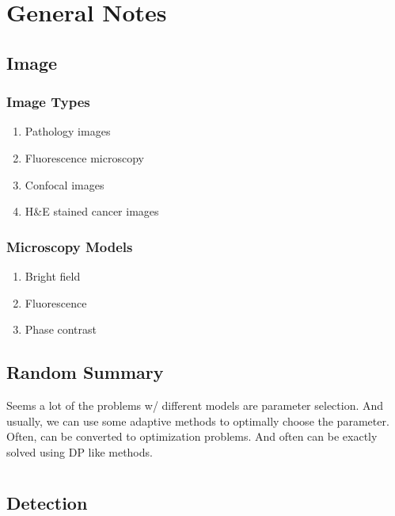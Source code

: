 \documentclass[10pt,a4paper]{article}
\begin{document}
\section{General Notes}
\subsection{Image}
\subsubsection{Image Types}
\begin{enumerate}
	\item Pathology images
	\item Fluorescence microscopy
	\item Confocal images
	\item H\&E stained cancer images
\end{enumerate}
\subsubsection{Microscopy Models}
\begin{enumerate}
	\item Bright field
	\item Fluorescence
	\item Phase contrast
\end{enumerate}

\subsection{Random Summary}
Seems a lot of the problems w/ different models are parameter selection. And usually, we can use some adaptive methods to optimally choose the parameter.\\
Often, can be converted to optimization problems. And often can be exactly solved using DP like methods.




\section{\cite{Chen2013}}

\section{\cite{Xing2016}}

\subsection{Detection}
\end{document}
